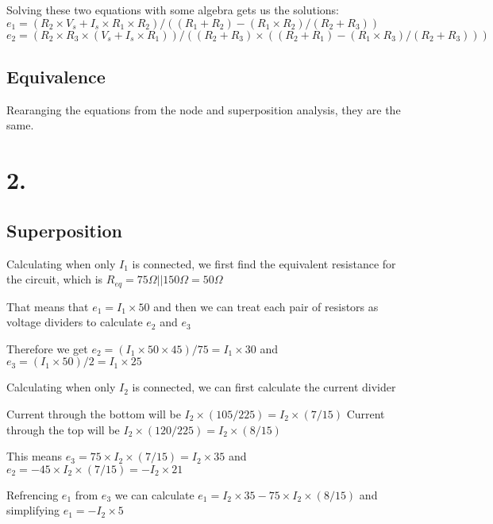 \documentclass{article}
\begin{document}
Solving these two equations with some algebra gets us the solutions:\newline
$e_1=(R_2\times V_s+I_s\times R_1\times R_2)/((R_1+R_2)-(R_1\times R_2)/(R_2+R_3))$\newline
$e_2=(R_2\times R_3\times (V_s+I_s\times R_1))/((R_2+R_3)\times((R_2+R_1)-(R_1\times R_3)/(R_2+R_3)))$

\subsection*{Equivalence}

Rearanging the equations from the node and superposition analysis, they are the same.

\section*{2.}

\subsection*{Superposition}
Calculating when only $I_1$ is connected, we first find the equivalent resistance
for the circuit, which is $R_{eq}=75\Omega||150\Omega=50\Omega$

\vspace*{1em}
\noindent That means that $e_1=I_1\times 50$ and then we can treat each pair of resistors as
voltage dividers to calculate $e_2$ and $e_3$

\vspace*{1em}
\noindent Therefore we get\newline
$e_2=(I_1\times 50\times 45)/75=I_1\times 30$ and $e_3=(I_1\times 50)/2=I_1\times 25$

\vspace*{1em}
\noindent Calculating when only $I_2$ is connected, we can first calculate the current divider

\vspace*{1em}
\noindent Current through the bottom will be $I_2\times(105/225)=I_2\times(7/15)$\newline
Current through the top will be $I_2\times(120/225)=I_2\times(8/15)$

\vspace*{1em}
\noindent This means $e_3=75\times I_2\times(7/15)=I_2\times35$ and \newline
$e_2=-45\times I_2\times(7/15)=-I_2\times21$

\vspace*{1em}
\noindent Refrencing $e_1$ from $e_3$ we can calculate\newline
$e_1=I_2\times35-75\times I_2\times(8/15)$ and simplifying\newline
$e_1=-I_2\times5$
\end{document}
